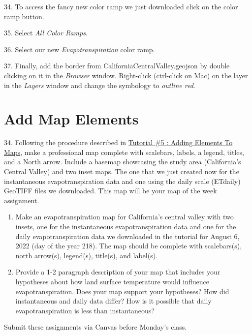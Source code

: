 \documentclass[oneside,a4paper,11pt,explicit]{book}
\begin{document}
34. To access the fancy new color ramp we just downloaded click on the color ramp button.

35. Select \textit{All Color Ramps}.

36. Select our new \textit{Evapotranspiration} color ramp. 

37. Finally, add the border from CaliforniaCentralValley.geojson by double clicking on it in the \textit{Browser} window. Right-click (ctrl-click on Mac) on the layer in the \textit{Layers} window and change the symbology to \textit{outline red}. 


\section{Add Map Elements}

34. Following the procedure described in \href{https://jeremydforsythe.github.io/icecream-tutorials/Tutorial5_AddingElementsToMaps/Tutorial5_AddingElementsToMaps.pdf}{Tutorial \#5 : Adding Elements To Maps}, make a professional map complete with scalebars, labels, a legend, titles, and a North arrow. Include a basemap showcasing the study area (California's Central Valley) and two inset maps. The one that we just created now for the instantaneous evapotranspiration data and one using the daily scale (ETdaily) GeoTIFF files we downloaded. This map will be your map of the week assignment.

\begin{tcolorbox}[colback=yellow!5!white,colframe=IceCreamOrbit,title= \vspace{.2em} \Large Map of the Week Assignments]
	\large
	\begin{enumerate}
		\item Make an evapotranspiration map for California's central valley with two insets, one for the instantaneous evapotranspiration data and one for the daily evapotranspiration data we downloaded in the tutorial for August 6, 2022 (day of the year 218). The map should be complete with scalebars(s), north arrow(s), legend(s), title(s), and label(s). 
        \item Provide a 1-2 paragraph description of your map that includes your hypotheses about how land surface temperature would influence evapotranspiration. Does your map support your hypotheses? How did instantaneous and daily data differ? How is it possible that daily evapotranspiration is less than instantaneous?
	\end{enumerate}
	Submit these assignments via Canvas before Monday's class.
\end{tcolorbox}
\end{document}
